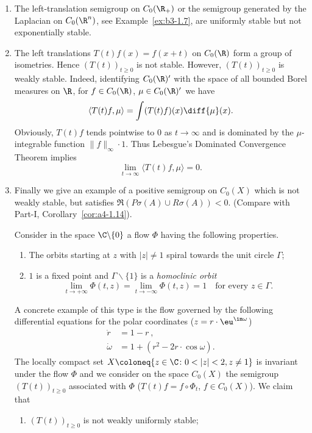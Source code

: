 \begin{example}\label{ex:b4-1.2}
%
%
\begin{enumerate}[\upshape (i), wide, labelindent=.25em]
\item
The left-translation semigroup on $C_{0}(\R_+)$ or the semigroup generated by the Laplacian on $C_{0}(\R^n)$, see Example~\ref{ex:b3-1.7}, are uniformly stable but not exponentially stable.

\item 
The left translations $T(t)f(x) = f(x+t)$ on $C_{0}(\R)$ form a group of isometries. 
Hence $(T(t))_{t \geq 0}$ is not stable. 
However, $(T(t))_{t \geq 0}$ is weakly stable. 
Indeed, identifying $C_{0}(\R)'$ with the space of all bounded Borel measures on $\R$, for $f \in C_{0}(\R)$, $\mu \in C_{0}(\R)'$ we have
\[
   \langle T(t)f,\mu \rangle = \int (T(t)f)(x) \diff{\mu}(x) .
\]
Obviously, $T(t)f$ tends pointwise to $0$ as $t \to \infty$ and is dominated by the $\mu$-integrable function $\|f\|_\infty \cdot 1$. 
Thus Lebesgue's Dominated Convergence Theorem implies
\[ 
\lim_{t\to\infty} \langle T(t)f,\mu \rangle = 0.
\]

\item 
Finally we give an example of a positive semigroup on $C_{0}(X)$ which is not weakly stable, but satisfies $\Re (P\sigma(A) \cup R\sigma(A)) < 0$. (Compare with Part-I, Corollary~\ref{cor:a4-1.14}).

Consider in the space $\C\backslash\{0\}$ a flow $\Phi$ having the following properties.%
\begin{enumerate}[--]
	\item 
	The orbits starting at $z$ with $|z| \neq 1$ spiral towards the unit circle $\Gamma$;
	
	\item 
	$1$ is a fixed point and $\Gamma\backslash\{1\}$ is a \emph{homoclinic orbit} \ie
    \[
    \lim_{t\to+\infty} \Phi(t,z) = \lim_{t\to-\infty} \Phi(t,z) = 1 \quad \text{for every $z \in \Gamma$.}
    \]
\end{enumerate}
A concrete example of this type is the flow governed by the following differential equations for the polar coordinates (\ie $z = r\cdot \eu^{\im\omega}$)
\begin{align*}
   \dot{r} &= 1 - r~,\\
   \dot{\omega} &= 1 + (r^2 - 2r\cdot\cos \omega) .
\end{align*}
The locally compact set $X \coloneq
 \{z \in \C \colon 0  <  |z|  <  2, z \neq 1\}$ is invariant under the flow $\Phi$ and we consider on the space $C_{0}(X)$ the semigroup $(T(t))_{t \geq 0}$ associated with $\Phi$ (\ie $T(t)f = f\circ\Phi_t$, $f \in C_{0}(X)$). 
 We claim that
\begin{enumerate}[\upshape (i)]
	\item
	$(T(t))_{t \geq 0}$ is not weakly uniformly stable;
	

\end{enumerate}
\end{enumerate}
\end{example}
